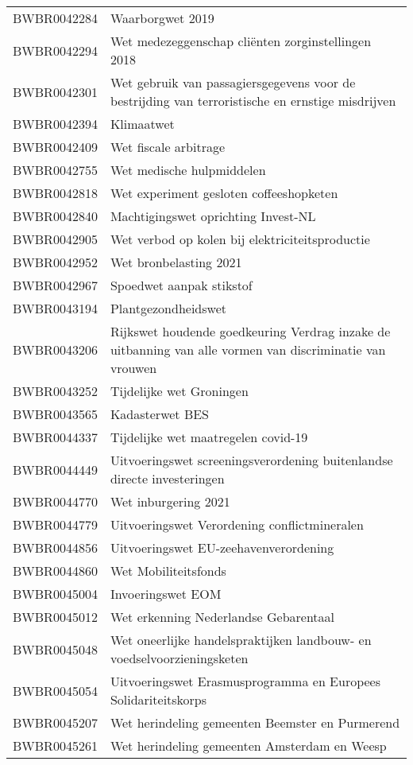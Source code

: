 \begin{longtable}{lp{}}
BWBR0042284 & Waarborgwet 2019 \\
BWBR0042294 & Wet medezeggenschap cliënten zorginstellingen 2018 \\
BWBR0042301 & Wet gebruik van passagiersgegevens voor de bestrijding van terroristische en ernstige misdrijven \\
BWBR0042394 & Klimaatwet \\
BWBR0042409 & Wet fiscale arbitrage \\
BWBR0042755 & Wet medische hulpmiddelen \\
BWBR0042818 & Wet experiment gesloten coffeeshopketen \\
BWBR0042840 & Machtigingswet oprichting Invest-NL \\
BWBR0042905 & Wet verbod op kolen bij elektriciteitsproductie \\
BWBR0042952 & Wet bronbelasting 2021 \\
BWBR0042967 & Spoedwet aanpak stikstof \\
BWBR0043194 & Plantgezondheidswet \\
BWBR0043206 & Rijkswet houdende goedkeuring Verdrag inzake de uitbanning van alle vormen van discriminatie van vrouwen \\
BWBR0043252 & Tijdelijke wet Groningen \\
BWBR0043565 & Kadasterwet BES \\
BWBR0044337 & Tijdelijke wet maatregelen covid-19 \\
BWBR0044449 & Uitvoeringswet screeningsverordening buitenlandse directe investeringen \\
BWBR0044770 & Wet inburgering 2021 \\
BWBR0044779 & Uitvoeringswet Verordening conflictmineralen \\
BWBR0044856 & Uitvoeringswet EU-zeehavenverordening \\
BWBR0044860 & Wet Mobiliteitsfonds \\
BWBR0045004 & Invoeringswet EOM \\
BWBR0045012 & Wet erkenning Nederlandse Gebarentaal \\
BWBR0045048 & Wet oneerlijke handelspraktijken landbouw- en voedselvoorzieningsketen \\
BWBR0045054 & Uitvoeringswet Erasmusprogramma en Europees Solidariteitskorps \\
BWBR0045207 & Wet herindeling gemeenten Beemster en Purmerend \\
BWBR0045261 & Wet herindeling gemeenten Amsterdam en Weesp \\

\end{longtable}
